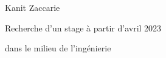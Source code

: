 \color{myBlack}
\vspace{0.5cm}
\begin{center}
    {\fontsize{36pt}{36pt}\selectfont Kanit Zaccarie}
\end{center}
\begin{center}
    {\LARGE Recherche d'un stage à partir d'avril 2023}
\end{center}
\begin{center}
    {\LARGE dans le milieu de l'ingénierie}
\end{center}